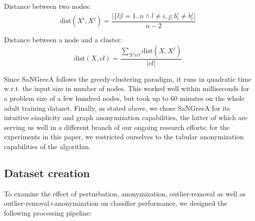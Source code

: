 \documentclass{llncs}
\providecommand{\abs}[1]{\lvert#1\rvert}
\begin{document}
Distance between two nodes:
\begin{equation*}
\text{dist}(X^i, X^j) = \frac{\abs{\{l|l=1..n \wedge l \ne i,j;b_l^i \ne b_l^j}}{n-2}
\end{equation*}

Distance between a node and a cluster:
\begin{equation*}
\text{dist}(X, cl) = \frac{\sum_{X^j \epsilon cl} \text{dist}(X, X^j) }{\abs{cl}}
\end{equation*}

Since SaNGreeA follows the greedy-clustering paradigm, it runs in quadratic time w.r.t. the input size in number of nodes. This worked well within milliseconds for a problem size of a few hundred nodes, but took up to 60 minutes on the whole adult training dataset. Finally, as stated above, we chose SaNGreeA for its intuitive simplicity and graph anonymization capabilities, the latter of which are serving us well in a different branch of our ongoing research efforts; for the experiments in this paper, we restricted ourselves to the tabular anonymization capabilities of the algorithm.


\subsection{Dataset creation}
\label{ssect:dataset_creation}

To examine the effect of perturbation, anonymization, outlier-removal as well as outlier-removal+anonymization on classifier performance, we designed the following processing pipeline:
\end{document}
